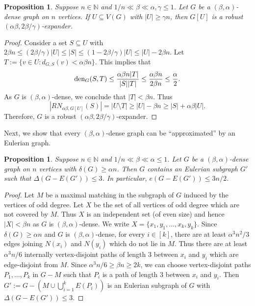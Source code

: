 \documentclass[a4paper, 11pt, reqno]{amsart}
\newtheorem{proposition}[definition]{Proposition}
\numberwithin{equation}{section}
\newcommand{\1}{{\rm 1\hspace*{-0.4ex}%
\rule{0.1ex}{1.52ex}\hspace*{0.2ex}}}
\newcommand{\N}{\mathbb N}
\newcommand{\den}{{\rm den}}
\newcommand{\sub}{\subseteq}
\newcommand{\COMMENT}[1]{}
\begin{document}
\begin{proposition}\label{prop: dense induced sub}
Suppose $n\in \N$ and $1/n \ll \beta \ll \alpha, \gamma\leq 1$. 
Let $G$ be a $(\beta,\alpha)$-dense graph on $n$ vertices. 
If $U\sub V(G)$ with $|U|\geq \gamma n$,
then $G[U]$ is a robust $(\alpha\beta,2\beta/\gamma)$-expander.
\end{proposition}
\begin{proof}
Consider a set $S \subseteq U$ with $2\beta n \leq (2\beta/\gamma) |U| \leq |S| \leq (1-2\beta/\gamma) |U| \leq |U|-2\beta n$. 
Let $T:= \{ v \in U: d_{G,S}(v) < \alpha\beta n\}$.
This implies that
$$\den_G(S,T) \leq \frac{\alpha\beta n|T|}{|S||T|} \leq \frac{\alpha \beta n}{2 \beta n} \leq \frac{\alpha}{2}.$$
As $G$ is $(\beta,\alpha)$-dense, we conclude that $|T|< \beta n$.
Thus 
$$|RN_{\alpha\beta,G[U]}(S)|
=|U\setminus T| 
\geq |U| - \beta n \geq |S|+ \alpha \beta |U|.$$
Therefore, $G$ is a robust $(\alpha\beta, 2\beta/\gamma)$-expander.
\end{proof}




Next, we show that every $(\beta,\alpha)$-dense graph can be ``approximated'' by an Eulerian graph.

\begin{proposition}\label{prop: making Eulerian}
Suppose $n\in \N$ and $1/n \ll \beta \ll \alpha \leq 1$.
Let $G$ be a $(\beta,\alpha)$-dense graph on $n$ vertices with $\delta(G)\geq \alpha n$.
Then $G$ contains an Eulerian subgraph $G'$ such that $\Delta(G-E(G'))\leq 3$.
In particular, $e(G-E(G'))\leq 3n/2$.
\end{proposition}
\begin{proof}
Let $M$ be a maximal matching in the subgraph of $G$ induced by the vertices of odd degree.
Let $X$ be the set of all vertices of odd degree which are not covered by $M$.
Thus $X$ is an independent set (of even size)
and hence $|X|< \beta n$ as $G$ is $(\beta,\alpha)$-dense.
We write $X=\{x_1,y_1,\ldots,x_k,y_k\}$. Since $\delta(G)\geq \alpha n$ and $G$ is $(\beta,\alpha)$-dense, 
for every $i\in [k]$, there are at least $\alpha^3 n^2/3$ edges joining $N(x_i)$ and $N(y_i)$ which do not lie in $M$.\COMMENT{$\alpha |N(x_i)||N(y_i)|/2 - |M| \geq \alpha^3 n^2/2 - n \geq \alpha^3 n^2/3$.} Thus there are at least $\alpha^3n/6$ internally vertex-disjoint paths of length $3$ between $x_i$ and $y_i$ which are edge-disjoint from $M$.\COMMENT{None of these paths has an inner vertex in $X$ since $X$ is independent set.}
Since $\alpha^3n/6 \geq \beta n \geq 2k$, 
we can choose vertex-disjoint paths $P_1,\dots, P_k$ in $G-M$ such that $P_i$ is a path of length $3$ between $x_i$ and $y_i$. 
Then $G':=G-(M\cup \bigcup_{i=1}^{k} E(P_i))$ is an Eulerian subgraph of $G$ with  $\Delta(G-E(G'))\leq 3$.
\end{proof}
\end{document}
